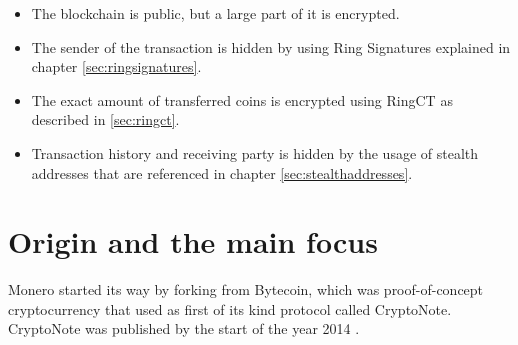 \documentclass[
  printed, %
  table,   %
  nolof,     %
  nolot,     %
           oneside, color
]{fithesis3}
\begin{document}

\begin{itemize}\itemsep0em
\item The blockchain is public, but a large part of it is encrypted.
\item The sender of the transaction is hidden by using Ring Signatures explained in chapter  \ref{sec:ringsignatures}.
\item The exact amount of transferred coins is encrypted using RingCT as described in \ref{sec:ringct}.
\item Transaction history and receiving party is hidden by the usage of stealth addresses that are referenced in chapter \ref{sec:stealthaddresses}.
\end{itemize}

\section{Origin and the main focus}
Monero started its way by forking from Bytecoin, which was proof-of-concept cryptocurrency that used as first of its kind protocol called CryptoNote. CryptoNote was published by the start of the year 2014 \cite{githubbytecoin}.


\end{document}
